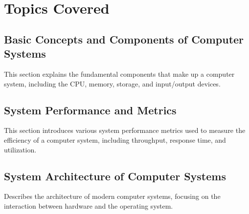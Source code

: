\documentclass[12pt]{article}
\begin{document}
\section{Topics Covered}

\subsection{Basic Concepts and Components of Computer Systems}
This section explains the fundamental components that make up a computer system, including the CPU, memory, storage, and input/output devices.

\subsection{System Performance and Metrics}
This section introduces various system performance metrics used to measure the efficiency of a computer system, including throughput, response time, and utilization.

\subsection{System Architecture of Computer Systems}
Describes the architecture of modern computer systems, focusing on the interaction between hardware and the operating system.
\end{document}
